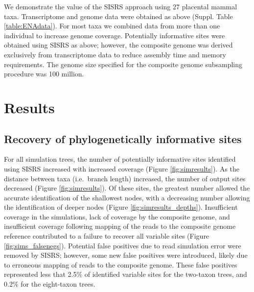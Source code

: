 \documentclass[11pt, oneside]{article}   	%
\begin{document}
We demonstrate the value of the SISRS approach using 27 placental mammal taxa.
Transcriptome and genome data were obtained as above (Suppl. Table \ref{table:ENAdata}).
For most taxa we combined data from more than one individual to increase genome coverage.
Potentially informative sites were obtained using SISRS as above; however, the composite genome was derived exclusively from transcriptome data to reduce assembly time and memory requirements.
The genome size specified for the composite genome subsampling procedure was 100 million.

\section{Results\label{sec:Results}}

\subsection{Recovery of phylogenetically informative sites}

For all simulation trees, the number of potentially informative sites identified using SISRS increased with increased coverage (Figure \ref{fig:simresults}). 
As the distance between taxa (i.e.\ branch length) increased, the number of output sites decreased (Figure \ref{fig:simresults}). 
Of these sites, the greatest number allowed the accurate identification of the shallowest nodes, with a decreasing number allowing the identification of deeper nodes (Figure \ref{fig:simresults_depths}). 
Insufficient coverage in the simulations, lack of coverage by the composite genome, and insufficient coverage following mapping of the reads to the composite genome reference contributed to a failure to recover all variable sites (Figure \ref{fig:sims_falsenegs}). 
Potential false positives due to read simulation error were removed by SISRS; however, some new false positives were introduced, likely due to erroneous mapping of reads to the composite genome.
These false positives represented less that 2.5\% of identified variable sites for the two-taxon trees, and 0.2\% for the eight-taxon trees.
\end{document}
